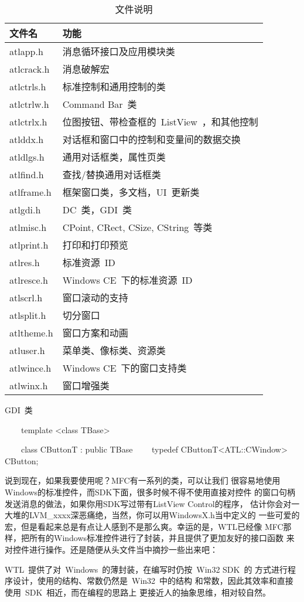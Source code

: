 \begin{table}[h]
  \centering
  \caption{文件说明}\label{tab:basic:files}
\begin{tabular}{|l|l|}
  \hline
  \textbf{文件名} & \textbf{功能} \\
  \hline\hline
  atlapp.h & 消息循环接口及应用模块类 \\
  \hline
  atlcrack.h & 消息破解宏 \\
  \hline
  atlctrls.h & 标准控制和通用控制的类 \\
  \hline
  atlctrlw.h & Command Bar~类 \\
  \hline
  atlctrlx.h & 位图按钮、带检查框的~ListView~，和其他控制 \\
  \hline
  atlddx.h & 对话框和窗口中的控制和变量间的数据交换 \\
  \hline
  atldlgs.h & 通用对话框类，属性页类 \\
  \hline
  atlfind.h & 查找/替换通用对话框类 \\
  \hline
  atlframe.h & 框架窗口类，多文档，UI~更新类 \\
  \hline
  atlgdi.h & DC~类，GDI~类 \\
  \hline
  atlmisc.h & CPoint, CRect, CSize, CString~等类 \\
  \hline
  atlprint.h & 打印和打印预览 \\
  \hline
  atlres.h & 标准资源~ID \\
  \hline
  atlresce.h & Windows CE~下的标准资源~ID \\
  \hline
  atlscrl.h & 窗口滚动的支持 \\
  \hline
  atlsplit.h & 切分窗口 \\
  \hline
  atltheme.h & 窗口方案和动画 \\
  \hline
  atluser.h & 菜单类、像标类、资源类 \\
  \hline
  atlwince.h & Windows CE~下的窗口支持类 \\
  \hline
  atlwinx.h & 窗口增强类 \\
  \hline
\end{tabular}

\end{table}

GDI~类


　　template <class TBase>

　　class CButtonT : public TBase
　　typedef CButtonT<ATL::CWindow>   CButton;

说到现在，如果我要使用呢？MFC有一系列的类，可以让我们
很容易地使用Windows的标准控件，而SDK下面，很多时候不得不使用直接对控件
的窗口句柄发送消息的做法，如果你用SDK写过带有ListView Control的程序，
估计你会对一大堆的LVM\_xxxx深恶痛绝，当然，你可以用WindowsX.h当中定义的
一些可爱的宏，但是看起来总是有点让人感到不是那么爽。幸运的是，WTL已经像
MFC那样，把所有的Windows标准控件进行了封装，并且提供了更加友好的接口函数
来对控件进行操作。还是随便从头文件当中摘抄一些出来吧：

WTL~提供了对~Windows~的薄封装，在编写时仍按~Win32 SDK~的
方式进行程序设计，使用的结构、常数仍然是~Win32~中的结构
和常数，因此其效率和直接使用~SDK~相近，而在编程的思路上
更接近人的抽象思维，相对较自然。
